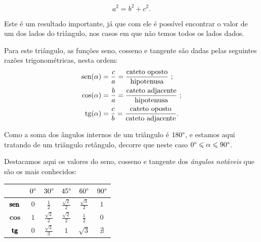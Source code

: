 \begin{teo}
\begin{equation*}
  a^2= b^2 + c^2.
\end{equation*}
\end{teo}


 
 Este é um resultado importante, já que com ele é possível encontrar o valor de um dos lados do triângulo, nos casos em que não temos todos os lados dados.

 Para este triângulo, as funções seno, cosseno e tangente são dadas pelas seguintes razões trigonométricas, nesta ordem:
  \begin{align*}
   \operatorname{sen}(\alpha)&= \frac{c}{a}= \frac{\mbox{cateto oposto}}{\mbox{hipotenusa}} \ ; \\
   \cos(\alpha)&= \frac{b}{a}= \frac{\mbox{cateto adjacente}}{\mbox{hipotenusa}} \ ; \\
   \operatorname{tg}(\alpha)&= \frac{c}{b}= \frac{\mbox{cateto oposto}}{\mbox{cateto adjacente}}.
  \end{align*}
 
 Como a soma dos ângulos internos de um triângulo é $180 \degree$, e estamos aqui tratando de um triângulo retângulo, decorre que neste caso $0 \degree \leqslant \alpha \leqslant 90 \degree$. 
 
 Destacamos aqui os valores do seno, cosseno e tangente dos \emph{ângulos notáveis} que são os mais conhecidos:

 \begin{table}[H]
 \centering
 \begin{tabular}{|c|c|c|c|c|c|} \hline
 \rowcolor{gray}
               & $0 \degree$  & $30 \degree$  & $45 \degree$  & $60 \degree$ & $90 \degree$  \\\hline
  $\pmb{\operatorname{sen}}$ & $0$ &$\frac{1}{2}$ & $\frac{\sqrt{2}}{2}$ & $\frac{\sqrt{3}}{2}$ & $1$ \\\hline
  $\pmb{\cos}$ & $1$ & $\frac{\sqrt{3}}{2}$ & $\frac{\sqrt{2}}{2}$ & $\frac{1}{2}$ & $0$ \\\hline
  $\pmb{\operatorname{tg}}$ & $0$ & $\frac{\sqrt{3}}{3}$ & $1$ & $\sqrt{3}$ & $\nexists$ \\\hline
 \end{tabular}
\end{table}
 
